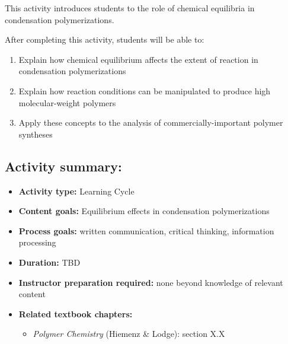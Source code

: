 %
%
%
%

\renewcommand{\figpath}{content/polymchem/stepgrowth/condensation-equilibria/figs}

\begin{activity}

\begin{instructornotes}

	This activity introduces students to the role of chemical equilibria in condensation polymerizations.
	
	After completing this activity, students will be able to:
			\begin{enumerate}
				\item Explain how chemical equilibrium affects the extent of reaction in condensation polymerizations
				\item Explain how reaction conditions can be manipulated to produce high molecular-weight polymers
				\item Apply these concepts to the analysis of commercially-important polymer syntheses
			\end{enumerate}
	
			
	\subsection*{Activity summary:}
	\begin{itemize}
		\item \textbf{Activity type:} Learning Cycle
		\item \textbf{Content goals:} Equilibrium effects in condensation polymerizations
		\item \textbf{Process goals:} %
			written communication, critical thinking, information processing
		\item \textbf{Duration:} TBD %
		\item \textbf{Instructor preparation required:} none beyond knowledge of relevant content
		\item \textbf{Related textbook chapters:}
			\begin{itemize}
				\item \emph{Polymer Chemistry} (Hiemenz \& Lodge): section X.X
			\end{itemize}
	\end{itemize}


\end{instructornotes}
\end{activity}
